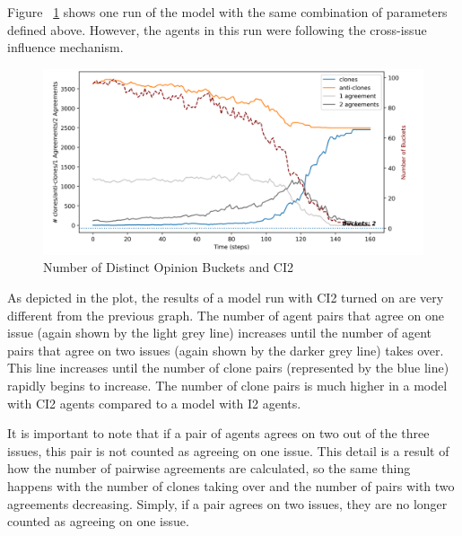 Figure ~\ref{H3_census_CI2} shows one run of the model with the same combination of parameters defined above. However, the agents in this run were following the cross-issue influence mechanism. 

\begin{figure}
\centering
\includegraphics[width=1.0\columnwidth]{./Graphs/census3CI2.png}
\caption{Number of Distinct Opinion Buckets and CI2}
\label{H3_census_CI2}
\end{figure}

As depicted in the plot, the results of a model run with CI2 turned on are very different from the previous graph. The number of agent pairs that agree on one issue (again shown by the light grey line) increases until the number of agent pairs that agree on two issues (again shown by the darker grey line) takes over. This line increases until the number of clone pairs (represented by the blue line) rapidly begins to increase. The number of clone pairs is much higher in a model with CI2 agents compared to a model with I2 agents.  

It is important to note that if a pair of agents agrees on two out of the three issues, this pair is not counted as agreeing on one issue. This detail is a result of how the number of pairwise agreements are calculated, so the same thing happens with the number of clones taking over and the number of pairs with two agreements decreasing. Simply, if a pair agrees on two issues, they are no longer counted as agreeing on one issue.

